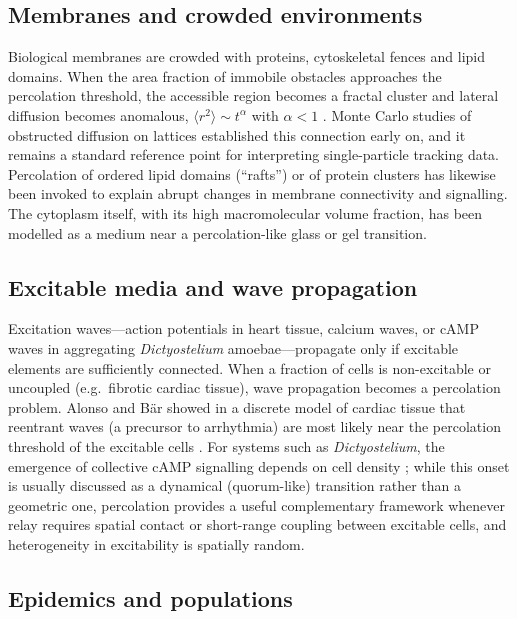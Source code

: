 \documentclass[11pt]{article}
\begin{document}
\subsection{Membranes and crowded environments}\label{sec:membrane}

Biological membranes are crowded with proteins, cytoskeletal fences and lipid domains. When the area fraction of immobile obstacles approaches the percolation threshold, the accessible region becomes a fractal cluster and lateral diffusion becomes anomalous, $\langle r^2\rangle\sim t^{\alpha}$ with $\alpha<1$ \cite{Saxton1994}. Monte Carlo studies of obstructed diffusion on lattices established this connection early on, and it remains a standard reference point for interpreting single-particle tracking data. Percolation of ordered lipid domains (``rafts'') or of protein clusters has likewise been invoked to explain abrupt changes in membrane connectivity and signalling. The cytoplasm itself, with its high macromolecular volume fraction, has been modelled as a medium near a percolation-like glass or gel transition.

\subsection{Excitable media and wave propagation}

Excitation waves---action potentials in heart tissue, calcium waves, or cAMP waves in aggregating \emph{Dictyostelium} amoebae---propagate only if excitable elements are sufficiently connected. When a fraction of cells is non-excitable or uncoupled (e.g.\ fibrotic cardiac tissue), wave propagation becomes a percolation problem. Alonso and B\"ar showed in a discrete model of cardiac tissue that reentrant waves (a precursor to arrhythmia) are most likely near the percolation threshold of the excitable cells \cite{AlonsoBar2013}. For systems such as \emph{Dictyostelium}, the emergence of collective cAMP signalling depends on cell density \cite{Gregor2010}; while this onset is usually discussed as a dynamical (quorum-like) transition rather than a geometric one, percolation provides a useful complementary framework whenever relay requires spatial contact or short-range coupling between excitable cells, and heterogeneity in excitability is spatially random.

\subsection{Epidemics and populations}
\end{document}
